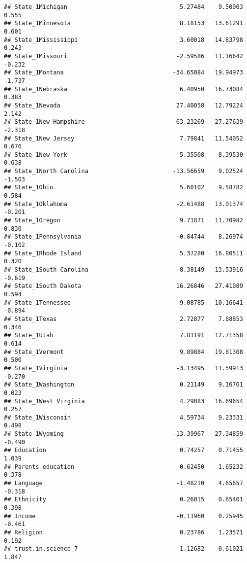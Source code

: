 \documentclass[
]{article}
\begin{document}
\begin{verbatim}
## State_1Michigan                                5.27484    9.50903   0.555
## State_1Minnesota                               8.18153   13.61291   0.601
## State_1Mississippi                             3.60018   14.83798   0.243
## State_1Missouri                               -2.59586   11.16642  -0.232
## State_1Montana                               -34.65084   19.94973  -1.737
## State_1Nebraska                                6.40950   16.73084   0.383
## State_1Nevada                                 27.40058   12.79224   2.142
## State_1New Hampshire                         -63.23269   27.27639  -2.318
## State_1New Jersey                              7.79841   11.54052   0.676
## State_1New York                                5.35508    8.39530   0.638
## State_1North Carolina                        -13.56659    9.02524  -1.503
## State_1Ohio                                    5.60102    9.58782   0.584
## State_1Oklahoma                               -2.61488   13.01374  -0.201
## State_1Oregon                                  9.71871   11.70982   0.830
## State_1Pennsylvania                           -0.84744    8.26974  -0.102
## State_1Rhode Island                            5.37280   16.80511   0.320
## State_1South Carolina                         -8.38149   13.53916  -0.619
## State_1South Dakota                           16.26846   27.41089   0.594
## State_1Tennessee                              -9.08785   10.16641  -0.894
## State_1Texas                                   2.72877    7.88853   0.346
## State_1Utah                                    7.81191   12.71358   0.614
## State_1Vermont                                 9.89884   19.81308   0.500
## State_1Virginia                               -3.13495   11.59913  -0.270
## State_1Washington                              0.21149    9.16761   0.023
## State_1West Virginia                           4.29083   16.69654   0.257
## State_1Wisconsin                               4.59734    9.23331   0.498
## State_1Wyoming                               -13.39967   27.34859  -0.490
## Education                                      0.74257    0.71455   1.039
## Parents_education                              0.62450    1.65232   0.378
## Language                                      -1.48210    4.65657  -0.318
## Ethnicity                                      0.26015    0.65401   0.398
## Income                                        -0.11960    0.25945  -0.461
## Religion                                       0.23786    1.23571   0.192
## trust.in.science_7                             1.12682    0.61021   1.847

\end{verbatim}
\end{document}
